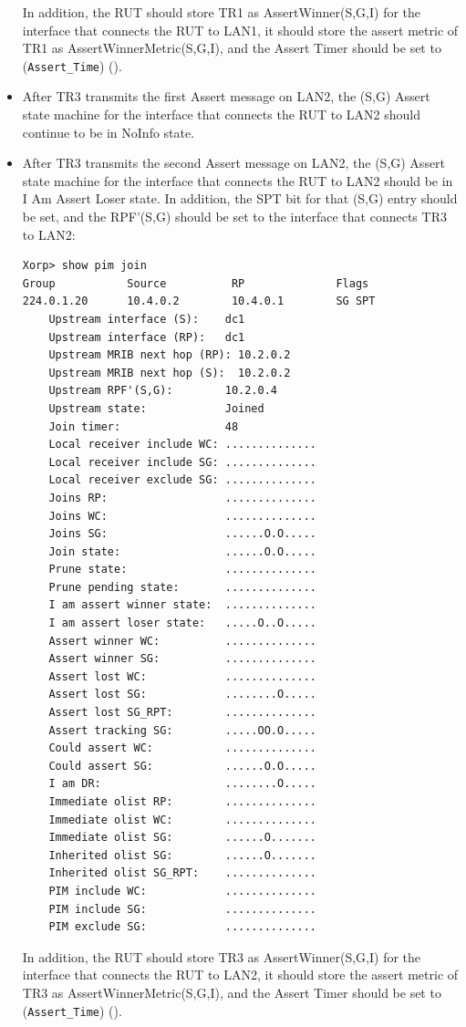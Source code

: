 \documentclass[11pt]{report}
\begin{document}
\begin{itemize}
  In addition, the RUT should store TR1 as AssertWinner(S,G,I) for the
  interface that connects the RUT to LAN1, it should store the assert metric
  of TR1 as AssertWinnerMetric(S,G,I), and the Assert Timer should be set to
  (\verb=Assert_Time=) ({\PimsmAssertTime}).

  \item After TR3 transmits the first Assert message on LAN2, the (S,G) Assert
  state machine for the interface that connects the RUT to LAN2 should
  continue to be in NoInfo state.

  \item After TR3 transmits the second Assert message on LAN2, the (S,G) Assert
  state machine for the interface that connects the RUT to LAN2 should be in I
  Am Assert Loser state. In addition, the SPT bit for that (S,G) entry should
  be set, and the RPF'(S,G) should be set to the interface that connects TR3
  to LAN2:

\begin{verbatim}
Xorp> show pim join 
Group           Source          RP              Flags
224.0.1.20      10.4.0.2        10.4.0.1        SG SPT 
    Upstream interface (S):    dc1
    Upstream interface (RP):   dc1
    Upstream MRIB next hop (RP): 10.2.0.2
    Upstream MRIB next hop (S):  10.2.0.2
    Upstream RPF'(S,G):        10.2.0.4
    Upstream state:            Joined 
    Join timer:                48
    Local receiver include WC: ..............
    Local receiver include SG: ..............
    Local receiver exclude SG: ..............
    Joins RP:                  ..............
    Joins WC:                  ..............
    Joins SG:                  ......O.O.....
    Join state:                ......O.O.....
    Prune state:               ..............
    Prune pending state:       ..............
    I am assert winner state:  ..............
    I am assert loser state:   .....O..O.....
    Assert winner WC:          ..............
    Assert winner SG:          ..............
    Assert lost WC:            ..............
    Assert lost SG:            ........O.....
    Assert lost SG_RPT:        ..............
    Assert tracking SG:        .....OO.O.....
    Could assert WC:           ..............
    Could assert SG:           ......O.O.....
    I am DR:                   ........O.....
    Immediate olist RP:        ..............
    Immediate olist WC:        ..............
    Immediate olist SG:        ......O.......
    Inherited olist SG:        ......O.......
    Inherited olist SG_RPT:    ..............
    PIM include WC:            ..............
    PIM include SG:            ..............
    PIM exclude SG:            ..............
\end{verbatim}

  In addition, the RUT should store TR3 as AssertWinner(S,G,I) for the
  interface that connects the RUT to LAN2, it should store the assert metric
  of TR3 as AssertWinnerMetric(S,G,I), and the Assert Timer should be set to
  (\verb=Assert_Time=) ({\PimsmAssertTime}).

\end{itemize}
\end{document}
